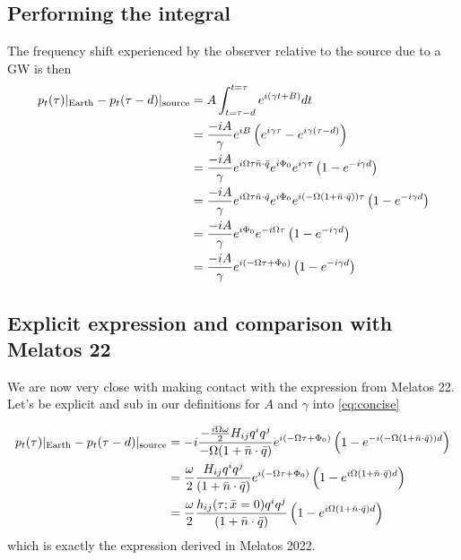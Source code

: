 \documentclass{tufte-handout} %
\begin{document}
\subsection{Performing the integral}

The frequency shift experienced by the observer relative to the source due to a GW is then
\begin{align}
p_t(\tau)|_{\rm Earth} - p_t(\tau - d)|_{\rm source} &= A \int_{t = \tau - d}^{t=\tau} e^{i (\gamma t + B)}dt  \\
&=\frac{-iA}{\gamma} e^{i B} \left(e^{i \gamma \tau} -e^{i \gamma (\tau - d)}\right) \\
&=\frac{-iA}{\gamma} e^{i \Omega \tau \bar{n} \cdot \bar{q}} e^{i \Phi_0}e^{i \gamma \tau} \left(1 -e^{-i \gamma d}\right) \\
&=\frac{-iA}{\gamma} e^{i \Omega \tau \bar{n} \cdot \bar{q}} e^{i \Phi_0}e^{i (-\Omega (1 + \bar{n}\cdot \bar{q}) ) \tau} \left(1 -e^{-i \gamma d}\right) \\
&=\frac{-iA}{\gamma} e^{i \Phi_0}e^{-i \Omega \tau} \left(1 -e^{-i \gamma d}\right) \\
&=\frac{-iA}{\gamma} e^{i(-\Omega \tau +\Phi_0)} \left(1 -e^{-i \gamma d}\right) 
\label{eq:concise}
\end{align}








\subsection{Explicit expression and comparison with Melatos 22}
We are now very close with making contact with the expression from Melatos 22. Let's be explicit and sub in our definitions for $A$ and $\gamma$ into \ref{eq:concise}


\begin{align}
p_t(\tau)|_{\rm Earth} - p_t(\tau - d)|_{\rm source} &=-i \frac{-\frac{i\Omega \omega}{2} H_{ij}q^i q^j }{-\Omega (1 + \bar{n}\cdot \bar{q}) } e^{i(-\Omega \tau +\Phi_0)} \left(1 -e^{-i (-\Omega (1 + \bar{n}\cdot \bar{q}) ) d}\right) \\
&=\frac{\omega}{2} \frac{ H_{ij}q^i q^j }{(1 + \bar{n}\cdot \bar{q}) } e^{i(-\Omega \tau +\Phi_0)} \left(1 -e^{i \Omega (1 + \bar{n}\cdot \bar{q})  d}\right) \\
&=\frac{\omega}{2} \frac{ h_{ij} (\tau; \bar{x}= 0)q^i q^j }{(1 + \bar{n}\cdot \bar{q}) }  \left(1 -e^{i \Omega (1 + \bar{n}\cdot \bar{q})  d}\right)
\label{eq:final}
\end{align}
which is exactly the expression derived in Melatos 2022. 
\end{document}
